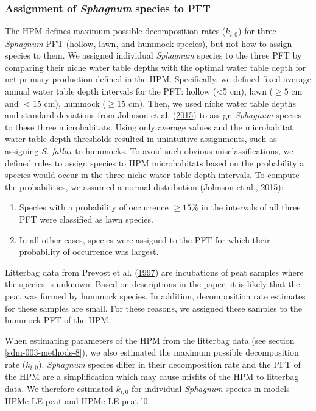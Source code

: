 \documentclass[
  12pt,
]{article}
\begin{document}
\hypertarget{sdm-003-methods-4}{%
\subsubsection{\texorpdfstring{Assignment of \emph{Sphagnum} species to PFT}{Assignment of Sphagnum species to PFT}}\label{sdm-003-methods-4}}

The HPM defines maximum possible decomposition rates (\(k_{i,0}\)) for three \emph{Sphagnum} PFT (hollow, lawn, and hummock species), but not how to assign species to them. We assigned individual \emph{Sphagnum} species to the three PFT by comparing their niche water table depths with the optimal water table depth for net primary production defined in the HPM. Specifically, we defined fixed average annual water table depth intervals for the PFT: hollow (\textless5 cm), lawn (\(\ge5\) cm and \(<15\) cm), hummock (\(\ge15\) cm). Then, we used niche water table depths and standard deviations from Johnson et al. (\protect\hyperlink{ref-Johnson.2015}{2015}) to assign \emph{Sphagnum} species to these three microhabitats. Using only average values and the microhabitat water table depth thresholds resulted in unintuitive assignments, such as assigning \emph{S. fallax} to hummocks. To avoid such obvious misclassifications, we defined rules to assign species to HPM microhabitats based on the probability a species would occur in the three niche water table depth intervals. To compute the probabilities, we assumed a normal distribution (\protect\hyperlink{ref-Johnson.2015}{Johnson et al., 2015}):

\begin{enumerate}
\def\labelenumi{\arabic{enumi}.}
\item
  Species with a probability of occurrence \(\ge15\)\% in the intervals of all three PFT were classified as lawn species.
\item
  In all other cases, species were assigned to the PFT for which their probability of occurrence was largest.
\end{enumerate}

Litterbag data from Prevost et al. (\protect\hyperlink{ref-Prevost.1997}{1997}) are incubations of peat samples where the species is unknown. Based on descriptions in the paper, it is likely that the peat was formed by hummock species. In addition, decomposition rate estimates for these samples are small. For these reasons, we assigned these samples to the hummock PFT of the HPM.

When estimating parameters of the HPM from the litterbag data (see section \ref{sdm-003-methods-8}), we also estimated the maximum possible decomposition rate (\(k_{i,0}\)). \emph{Sphagnum} species differ in their decomposition rate and the PFT of the HPM are a simplification which may cause misfits of the HPM to litterbag data. We therefore estimated \(k_{i,0}\) for individual \emph{Sphagnum} species in models HPMe-LE-peat and HPMe-LE-peat-l0.
\end{document}
